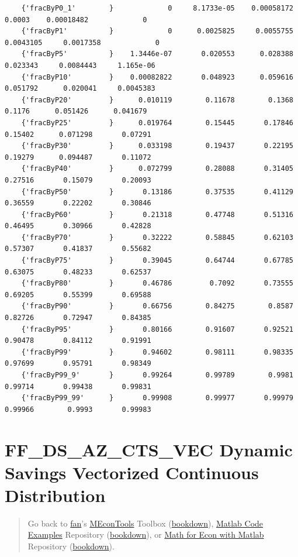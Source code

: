 \documentclass[
]{book}
\begin{document}
\begin{verbatim}
    {'fracByP0_1'        }             0     8.1733e-05    0.00058172        0.0003    0.00018482             0 
    {'fracByP1'          }             0      0.0025825     0.0055755     0.0043105     0.0017358             0 
    {'fracByP5'          }    1.3446e-07       0.020553      0.028388      0.023343     0.0084443     1.165e-06 
    {'fracByP10'         }    0.00082822       0.048923      0.059616      0.051792      0.020041     0.0045383 
    {'fracByP20'         }      0.010119        0.11678        0.1368        0.1176      0.051426      0.041679 
    {'fracByP25'         }      0.019764        0.15445       0.17846       0.15402      0.071298       0.07291 
    {'fracByP30'         }      0.033198        0.19437       0.22195       0.19279      0.094487       0.11072 
    {'fracByP40'         }      0.072799        0.28088       0.31405       0.27516       0.15079       0.20093 
    {'fracByP50'         }       0.13186        0.37535       0.41129       0.36559       0.22202       0.30846 
    {'fracByP60'         }       0.21318        0.47748       0.51316       0.46495       0.30966       0.42828 
    {'fracByP70'         }       0.32222        0.58845       0.62103       0.57307       0.41837       0.55682 
    {'fracByP75'         }       0.39045        0.64744       0.67785       0.63075       0.48233       0.62537 
    {'fracByP80'         }       0.46786         0.7092       0.73555       0.69205       0.55399       0.69588 
    {'fracByP90'         }       0.66756        0.84275        0.8587       0.82726       0.72947       0.84385 
    {'fracByP95'         }       0.80166        0.91607       0.92521       0.90478       0.84112       0.91991 
    {'fracByP99'         }       0.94602        0.98111       0.98335       0.97699       0.95791       0.98349 
    {'fracByP99_9'       }       0.99264        0.99789        0.9981       0.99714       0.99438       0.99831 
    {'fracByP99_99'      }       0.99908        0.99977       0.99979       0.99966        0.9993       0.99983 
\end{verbatim}

\hypertarget{ff_ds_az_cts_vec-dynamic-savings-vectorized-continuous-distribution}{%
\section{FF\_DS\_AZ\_CTS\_VEC Dynamic Savings Vectorized Continuous Distribution}\label{ff_ds_az_cts_vec-dynamic-savings-vectorized-continuous-distribution}}

\begin{quote}
Go back to \href{http://fanwangecon.github.io/}{fan}'s \href{https://fanwangecon.github.io/MEconTools/}{MEconTools} Toolbox (\href{https://fanwangecon.github.io/MEconTools/bookdown}{bookdown}), \href{https://fanwangecon.github.io/M4Econ/}{Matlab Code Examples} Repository (\href{https://fanwangecon.github.io/M4Econ/bookdown}{bookdown}), or \href{https://fanwangecon.github.io/Math4Econ/}{Math for Econ with Matlab} Repository (\href{https://fanwangecon.github.io/Math4Econ/bookdown}{bookdown}).
\end{quote}
\end{document}
